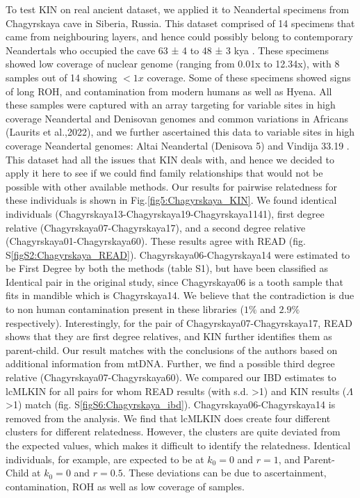\documentclass[12pt, letterpaper]{article}
\begin{document}
To test KIN on real ancient dataset, we applied it to Neandertal specimens from Chagyrskaya cave in Siberia, Russia. This dataset comprised of 14 specimens that came from neighbouring layers, and hence could possibly belong to contemporary Neandertals who occupied the cave 63 ± 4 to 48 ± 3 kya \cite{kolobova_archaeological_2020-1}. These specimens showed low coverage of nuclear genome (ranging from 0.01x to 12.34x), with 8 samples out of 14 showing $<1x$ coverage. Some of these specimens showed signs of long ROH, and contamination from modern humans as well as Hyena. All these samples were captured with an array targeting for variable sites in high coverage Neandertal and Denisovan genomes and common variations in Africans (Laurits et al.,2022), and we further ascertained this data to variable sites in high coverage Neandertal genomes: Altai Neandertal (Denisova 5) \cite{prufer_complete_2014} and Vindija 33.19 \cite{prufer_high-coverage_2017}. This dataset had all the issues that KIN deals with, and hence we decided to apply it here to see if we could find family relationships that would not be possible with other available methods. Our results for pairwise relatedness for these individuals is shown in Fig.\ref{fig5:Chagyrskaya_KIN}. We found identical individuals (Chagyrskaya13-Chagyrskaya19-Chagyrskaya1141), first degree relative (Chagyrskaya07-Chagyrskaya17), and a second degree relative (Chagyrskaya01-Chagyrskaya60). These results agree with READ (fig. S\ref{figS2:Chagyrskaya_READ}). Chagyrskaya06-Chagyrskaya14 were estimated to be First Degree by both the methods (table S1), but have been classified as Identical pair in the original study, since Chagyrskaya06 is a tooth sample that fits in mandible which is Chagyrskaya14. We believe that the contradiction is due to non human contamination present in these libraries ($1\%$ and $2.9\%$ respectively). Interestingly, for the pair of Chagyrskaya07-Chagyrskaya17, READ shows that they are first degree relatives, and KIN further identifies them as parent-child. Our result matches with the conclusions of the authors based on additional information from mtDNA. Further, we find a possible third degree relative (Chagyrskaya07-Chagyrskaya60). We compared our IBD estimates to lcMLKIN for all pairs for whom READ results (with s.d. >1) and KIN results ($\Lambda$>1) match (fig. S\ref{figS6:Chagyrskaya_ibd}). Chagyrskaya06-Chagyrskaya14 is removed from the analysis. We find that lcMLKIN does create four different clusters for different relatedness. However, the clusters are quite deviated from the expected values, which makes it difficult to identify the relatedness. Identical individuals, for example, are expected to be at $k_0 = 0$ and $r = 1$, and Parent-Child at $k_0 = 0$ and $r = 0.5$. These deviations can be due to ascertainment, contamination, ROH as well as low coverage of samples.
\end{document}
